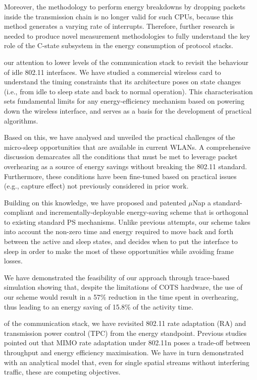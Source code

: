 \documentclass[twoside,nohyper]{tufte-book}
\begin{document}
Moreover, the methodology to perform energy breakdowns by dropping packets inside the transmission chain is no longer valid for such CPUs, because this method generates a varying rate of interrupts. Therefore, further research is needed to produce novel measurement methodologies to fully understand the key role of the C-state subsystem in the energy consumption of protocol stacks.

 our attention to lower levels of the communication stack to revisit the behaviour of idle 802.11 interfaces. We have studied a commercial wireless card to understand the timing constraints that its architecture poses on state changes (i.e., from idle to sleep state and back to normal operation). This characterisation sets fundamental limits for any energy-efficiency mechanism based on powering down the wireless interface, and serves as a basis for the development of practical algorithms.

Based on this, we have analysed and unveiled the practical challenges of the micro-sleep opportunities that are available in current WLANs. A comprehensive discussion demarcates all the conditions that must be met to leverage packet overhearing as a source of energy savings without breaking the 802.11 standard. Furthermore, these conditions have been fine-tuned based on practical issues (e.g., capture effect) not previously considered in prior work.

Building on this knowledge, we have proposed\cite[-1in]{contrib-05a} and patented\cite[-.2in]{contrib-05b} \(\mu\)Nap a standard-compliant and incrementally-deployable energy-saving scheme that is orthogonal to existing standard PS mechanisms. Unlike previous attempts, our scheme takes into account the non-zero time and energy required to move back and forth between the active and sleep states, and decides when to put the interface to sleep in order to make the most of these opportunities while avoiding frame losses.

We have demonstrated the feasibility of our approach through trace-based simulation showing that, despite the limitations of COTS hardware, the use of our scheme would result in a 57\% reduction in the time spent in overhearing, thus leading to an energy saving of 15.8\% of the activity time.

 of the communication stack, we have revisited 802.11 rate adaptation (RA) and transmission power control (TPC) from the energy standpoint. Previous studies pointed out that MIMO rate adaptation under 802.11n poses a trade-off between throughput and energy efficiency maximisation. We have in turn demonstrated with an analytical model that, even for single spatial streams without interfering traffic, these are competing objectives.
\end{document}
